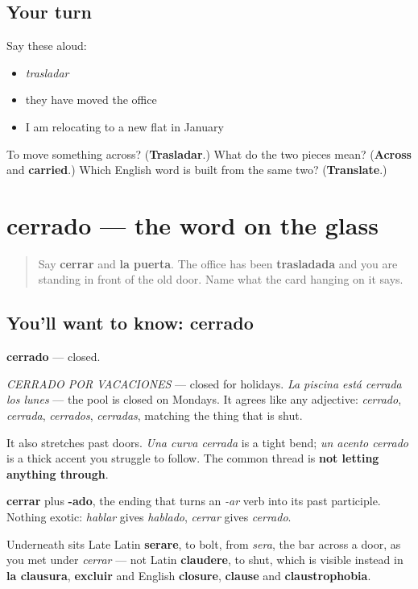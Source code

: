 \subsection*{Your turn}
Say these aloud:

\begin{itemize}
\raggedright
  \item \emph{trasladar}
  \item they have moved the office
  \item I am relocating to a new flat in January
\end{itemize}

\begin{tcolorbox}[breakable,colback=teal!4,colframe=teal!35!black,title={Before you move on}]
To move something across? (\textbf{Trasladar}.) What do the two pieces mean? (\textbf{Across} and \textbf{carried}.) Which English word is built from the same two? (\textbf{Translate}.)
\end{tcolorbox}
\section[cerrado]{cerrado — the word on the glass}

\label{lesson:ES-C439-cerrado}



\begin{quote}
Say \textbf{cerrar} and \textbf{la puerta}. The office has been \textbf{trasladada} and you are standing in front of the old door. Name what the card hanging on it says.
\end{quote}

\subsection*{You'll want to know: cerrado}
\textbf{cerrado} — closed.

\emph{CERRADO POR VACACIONES} — closed for holidays. \emph{La piscina está cerrada los lunes} — the pool is closed on Mondays. It agrees like any adjective: \emph{cerrado}, \emph{cerrada}, \emph{cerrados}, \emph{cerradas}, matching the thing that is shut.

It also stretches past doors. \emph{Una curva cerrada} is a tight bend; \emph{un acento cerrado} is a thick accent you struggle to follow. The common thread is \textbf{not letting anything through}.

\begin{cousinweb}
\textbf{cerrar} plus \textbf{-ado}, the ending that turns an \emph{-ar} verb into its past participle. Nothing exotic: \emph{hablar} gives \emph{hablado}, \emph{cerrar} gives \emph{cerrado}.

Underneath sits Late Latin \textbf{serare}, to bolt, from \emph{sera}, the bar across a door, as you met under \emph{cerrar} — not Latin \textbf{claudere}, to shut, which is visible instead in \textbf{la clausura}, \textbf{excluir} and English \textbf{closure}, \textbf{clause} and \textbf{claustrophobia}.
\end{cousinweb}

